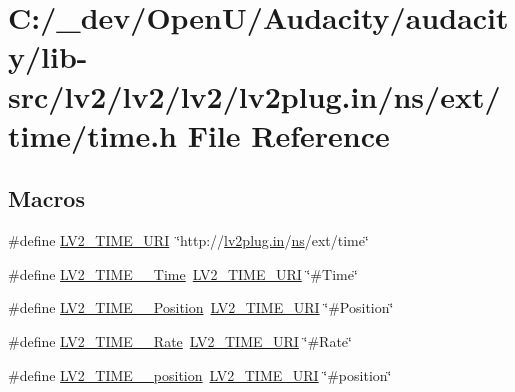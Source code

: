 \hypertarget{lib-src_2lv2_2lv2_2lv2_2lv2plug_8in_2ns_2ext_2time_2time_8h}{}\section{C\+:/\+\_\+dev/\+Open\+U/\+Audacity/audacity/lib-\/src/lv2/lv2/lv2/lv2plug.in/ns/ext/time/time.h File Reference}
\label{lib-src_2lv2_2lv2_2lv2_2lv2plug_8in_2ns_2ext_2time_2time_8h}
\subsection*{Macros}
\begin{DoxyCompactItemize}
\item 
\#define \hyperlink{lib-src_2lv2_2lv2_2lv2_2lv2plug_8in_2ns_2ext_2time_2time_8h_a3e4c1464d76481b52787ab634283fa3b}{L\+V2\+\_\+\+T\+I\+M\+E\+\_\+\+U\+RI}~\char`\"{}http\+://\hyperlink{latency_8c_a7d946209d777cb95fe30364b8d321207}{lv2plug.\+in}/\hyperlink{xmltok_8c_ab6aec1346fb6c7b2733f0f73c9536ad2}{ns}/ext/time\char`\"{}
\item 
\#define \hyperlink{lib-src_2lv2_2lv2_2lv2_2lv2plug_8in_2ns_2ext_2time_2time_8h_aea4c2c2f65d408265774ed331aa4c928}{L\+V2\+\_\+\+T\+I\+M\+E\+\_\+\+\_\+\+Time}~\hyperlink{lib-src_2lv2_2lv2_2lv2_2lv2plug_8in_2ns_2ext_2time_2time_8h_a3e4c1464d76481b52787ab634283fa3b}{L\+V2\+\_\+\+T\+I\+M\+E\+\_\+\+U\+RI} \char`\"{}\#Time\char`\"{}
\item 
\#define \hyperlink{lib-src_2lv2_2lv2_2lv2_2lv2plug_8in_2ns_2ext_2time_2time_8h_a9ad92407ea1d703510f8035c32dc7ccb}{L\+V2\+\_\+\+T\+I\+M\+E\+\_\+\+\_\+\+Position}~\hyperlink{lib-src_2lv2_2lv2_2lv2_2lv2plug_8in_2ns_2ext_2time_2time_8h_a3e4c1464d76481b52787ab634283fa3b}{L\+V2\+\_\+\+T\+I\+M\+E\+\_\+\+U\+RI} \char`\"{}\#Position\char`\"{}
\item 
\#define \hyperlink{lib-src_2lv2_2lv2_2lv2_2lv2plug_8in_2ns_2ext_2time_2time_8h_acc400998a4b48176763e25089fa8f1c7}{L\+V2\+\_\+\+T\+I\+M\+E\+\_\+\+\_\+\+Rate}~\hyperlink{lib-src_2lv2_2lv2_2lv2_2lv2plug_8in_2ns_2ext_2time_2time_8h_a3e4c1464d76481b52787ab634283fa3b}{L\+V2\+\_\+\+T\+I\+M\+E\+\_\+\+U\+RI} \char`\"{}\#Rate\char`\"{}
\item 
\#define \hyperlink{lib-src_2lv2_2lv2_2lv2_2lv2plug_8in_2ns_2ext_2time_2time_8h_aa9585824d03c8923aadd0b0843173ebb}{L\+V2\+\_\+\+T\+I\+M\+E\+\_\+\+\_\+position}~\hyperlink{lib-src_2lv2_2lv2_2lv2_2lv2plug_8in_2ns_2ext_2time_2time_8h_a3e4c1464d76481b52787ab634283fa3b}{L\+V2\+\_\+\+T\+I\+M\+E\+\_\+\+U\+RI} \char`\"{}\#position\char`\"{}

\end{DoxyCompactItemize}
